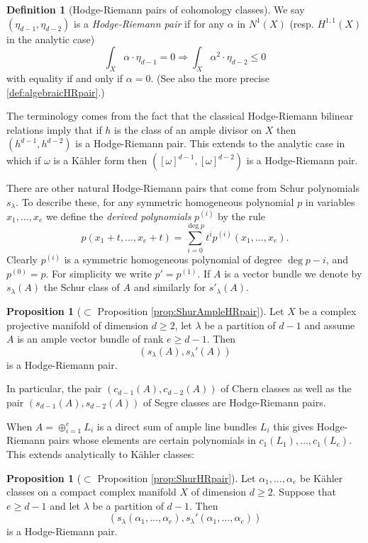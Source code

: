 \documentclass[a4,reqno]{amsart}
\theoremstyle{definition}
\newtheorem{proposition}[theorem]{Proposition}
\newtheorem{definition}[theorem]{Definition}
\numberwithin{equation}{section}
\begin{document}
\begin{definition}[Hodge-Riemann pairs of cohomology classes]\label{def:algebraicHR:intro}
We say $(\eta_{d-1},\eta_{d-2})$ is a \textit{Hodge-Riemann pair} if for any $\alpha$ in $ N^1(X)$ (resp. $H^{1,1}(X)$ in the analytic case)
$$\int_X \alpha \cdot \eta_{d-1} = 0 \Rightarrow \int_X \alpha^2 \cdot \eta_{d-2} \le 0$$ 
with equality if and only if $\alpha = 0$. (See also the more precise \cref{def:algebraicHRpair}.)
\end{definition}


The terminology comes from the fact that the classical Hodge-Riemann bilinear relations imply that if $h$ is the class of an ample divisor on $X$ then $(h^{d-1},h^{d-2})$ is a Hodge-Riemann pair.  This extends to the analytic case in which if $\omega$ is a K\"ahler form then $([\omega]^{d-1},[\omega]^{d-2})$ is a Hodge-Riemann pair.   

There are other natural Hodge-Riemann pairs that come from Schur polynomials $s_{\lambda}$.  To describe these, for any symmetric homogeneous polynomial $p$ in variables $x_1,\ldots,x_e$ we define the \emph{derived polynomials} $p^{(i)}$ by the rule
$$p(x_1+t,\ldots,x_{e}+t) = \sum_{i=0}^{\deg p}t^i p^{(i)}(x_1,\ldots,x_e).$$
Clearly $p^{(i)}$ is a symmetric homogeneous polynomial of degree $\deg p -i$, and $p^{(0)}=p$.  For simplicity we write $p' = p^{(1)}$.    If $A$ is a vector bundle we denote by $s_{\lambda}(A)$ the Schur class of $A$ and similarly for $s'_{\lambda}(A)$. 

\begin{proposition}[$\subset$ Proposition \ref{prop:ShurAmpleHRpair}] \label{prop:ShurAmpleHRpair:intro}
Let $X$ be a complex projective manifold of dimension $d\ge 2$,  let $\lambda$ be a partition of $d-1$ and assume $A$ is an ample vector bundle of rank $e\ge d-1$.    Then
$$(s_\lambda(A),s_\lambda'(A))$$ is a Hodge-Riemann pair. 

In particular, the pair $(c_{d-1}(A),c_{d-2}(A))$ of Chern classes as well as the pair $(s_{d-1}(A),s_{d-2}(A))$ of Segre classes are Hodge-Riemann pairs.
\end{proposition}

When $A=\oplus_{i=1}^e L_i$ is a direct sum of ample line bundles $L_i$ this gives Hodge-Riemann pairs whose elements are certain polynomials in $c_1(L_1),\ldots,c_1(L_e)$.  This extends analytically to K\"ahler classes:


\begin{proposition}[$\subset$ Proposition \ref{prop:ShurHRpair}]\label{prop:ShurHRpair:intro}
Let $\alpha_1,\ldots,\alpha_e$ be K\"ahler classes on a compact complex manifold $X$ of dimension $d\ge 2$. Suppose that $e \ge d-1$ and let $\lambda$ be a partition of $d-1$. Then $$(s_\lambda(\alpha_1,\ldots,\alpha_e),s_\lambda'(\alpha_1,\ldots,\alpha_e))$$ is a Hodge-Riemann pair.
\end{proposition}
\end{document}
